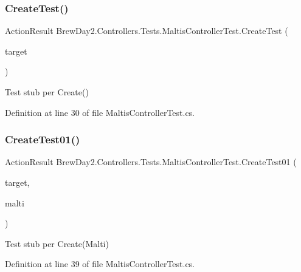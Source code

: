 \subsubsection{\texorpdfstring{Create\+Test()}{CreateTest()}}
{\footnotesize\ttfamily Action\+Result Brew\+Day2.\+Controllers.\+Tests.\+Maltis\+Controller\+Test.\+Create\+Test (\begin{DoxyParamCaption}\item[{\mbox{[}\+Pex\+Assume\+Under\+Test\mbox{]} \mbox{\hyperlink{class_brew_day2_1_1_controllers_1_1_maltis_controller}{Maltis\+Controller}}}]{target }\end{DoxyParamCaption})}



Test stub per Create()



Definition at line 30 of file Maltis\+Controller\+Test.\+cs.

\mbox{\label{class_brew_day2_1_1_controllers_1_1_tests_1_1_maltis_controller_test_a3dcc4b88f646570b3016aa6ccfd0d8c8}} 
\subsubsection{\texorpdfstring{Create\+Test01()}{CreateTest01()}}
{\footnotesize\ttfamily Action\+Result Brew\+Day2.\+Controllers.\+Tests.\+Maltis\+Controller\+Test.\+Create\+Test01 (\begin{DoxyParamCaption}\item[{\mbox{[}\+Pex\+Assume\+Under\+Test\mbox{]} \mbox{\hyperlink{class_brew_day2_1_1_controllers_1_1_maltis_controller}{Maltis\+Controller}}}]{target,  }\item[{\mbox{\hyperlink{class_brew_day2_1_1_models_1_1_malti}{Malti}}}]{malti }\end{DoxyParamCaption})}



Test stub per Create(\+Malti)



Definition at line 39 of file Maltis\+Controller\+Test.\+cs.

